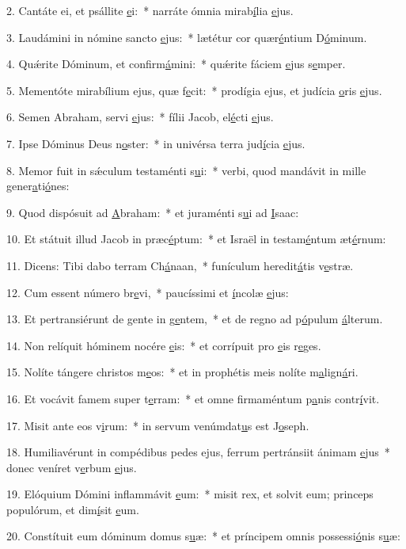 2. Cantáte ei, et psállite \uline{e}i:~* narráte ómnia mirab\uline{í}lia \uline{e}jus.\par 
3. Laudámini in nómine sancto \uline{e}jus:~* lætétur cor quær\uline{é}ntium D\uline{ó}minum.\par 
4. Quǽrite Dóminum, et confirm\uline{á}mini:~* quǽrite fáciem \uline{e}jus s\uline{e}mper.\par 
5. Mementóte mirabílium ejus, quæ f\uline{e}cit:~* prodígia ejus, et judícia \uline{o}ris \uline{e}jus.\par 
6. Semen Abraham, servi \uline{e}jus:~* fílii Jacob, el\uline{é}cti \uline{e}jus.\par 
7. Ipse Dóminus Deus n\uline{o}ster:~* in univérsa terra jud\uline{í}cia \uline{e}jus.\par 
8. Memor fuit in sǽculum testaménti s\uline{u}i:~* verbi, quod mandávit in mille gener\uline{a}ti\uline{ó}nes:\par 
9. Quod dispósuit ad \uline{A}braham:~* et juraménti s\uline{u}i ad \uline{I}saac:\par 
10. Et státuit illud Jacob in præc\uline{é}ptum:~* et Israël in testam\uline{é}ntum æt\uline{é}rnum:\par 
11. Dicens: Tibi dabo terram Ch\uline{á}naan,~* funículum heredit\uline{á}tis v\uline{e}stræ.\par 
12. Cum essent número br\uline{e}vi,~* paucíssimi et \uline{í}ncolæ \uline{e}jus:\par 
13. Et pertransiérunt de gente in g\uline{e}ntem,~* et de regno ad p\uline{ó}pulum \uline{á}lterum.\par 
14. Non relíquit hóminem nocére \uline{e}is:~* et corrípuit pro \uline{e}is r\uline{e}ges.\par 
15. Nolíte tángere christos m\uline{e}os:~* et in prophétis meis nolíte m\uline{a}lign\uline{á}ri.\par 
16. Et vocávit famem super t\uline{e}rram:~* et omne firmaméntum p\uline{a}nis contr\uline{í}vit.\par 
17. Misit ante eos v\uline{i}rum:~* in servum venúmdat\uline{u}s est J\uline{o}seph.\par 
18. Humiliavérunt in compédibus pedes ejus, ferrum pertránsiit ánimam \uline{e}jus~* donec veníret v\uline{e}rbum \uline{e}jus.\par 
19. Elóquium Dómini inflammávit \uline{e}um:~* misit rex, et solvit eum; princeps populórum, et dim\uline{í}sit \uline{e}um.\par 
20. Constítuit eum dóminum domus s\uline{u}æ:~* et príncipem omnis possessi\uline{ó}nis s\uline{u}æ:\par 
